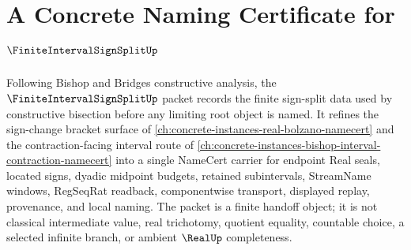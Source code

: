 \chapter{A Concrete Naming Certificate for $\FiniteIntervalSignSplitUp$}
\label{ch:concrete-instances-finite-interval-sign-split-namecert}

Following Bishop and Bridges constructive analysis, the $\FiniteIntervalSignSplitUp$ packet records the finite sign-split data used by constructive bisection before any limiting root object is named. It refines the sign-change bracket surface of \autoref{ch:concrete-instances-real-bolzano-namecert} and the contraction-facing interval route of \autoref{ch:concrete-instances-bishop-interval-contraction-namecert} into a single NameCert carrier for endpoint Real seals, located signs, dyadic midpoint budgets, retained subintervals, StreamName windows, RegSeqRat readback, componentwise transport, displayed replay, provenance, and local naming. The packet is a finite handoff object; it is not classical intermediate value, real trichotomy, quotient equality, countable choice, a selected infinite branch, or ambient $\RealUp$ completeness.

